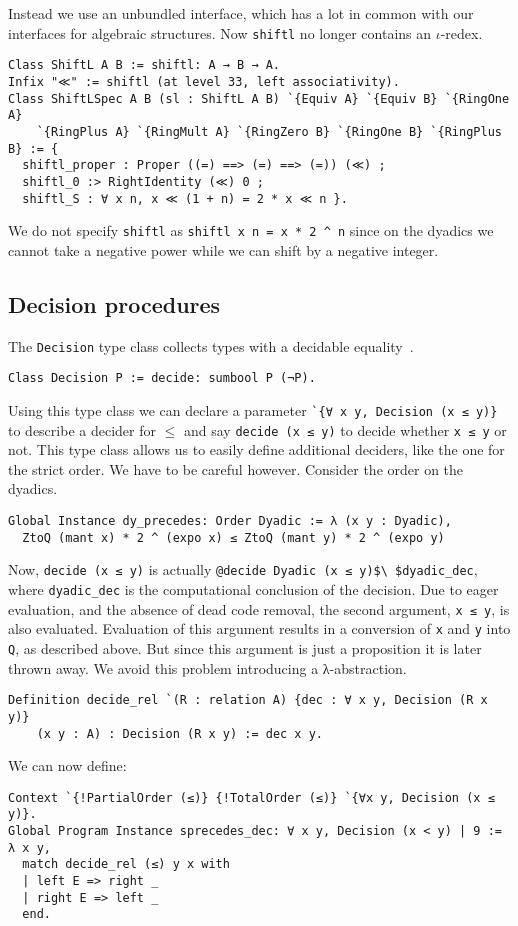 \documentclass[a4paper,10pt,runningheads]{llncs}
\begin{document}
Instead we use an unbundled interface, which has a lot in common with our interfaces for algebraic structures. Now \lstinline|shiftl| no longer contains an $ι$-redex. 
\begin{lstlisting}
Class ShiftL A B := shiftl: A → B → A.
Infix "≪" := shiftl (at level 33, left associativity).
Class ShiftLSpec A B (sl : ShiftL A B) `{Equiv A} `{Equiv B} `{RingOne A} 
	`{RingPlus A} `{RingMult A} `{RingZero B} `{RingOne B} `{RingPlus B} := {
  shiftl_proper : Proper ((=) ==> (=) ==> (=)) (≪) ;
  shiftl_0 :> RightIdentity (≪) 0 ;
  shiftl_S : ∀ x n, x ≪ (1 + n) = 2 * x ≪ n }.
\end{lstlisting}
We do not specify \lstinline|shiftl| as \lstinline|shiftl x n = x * 2 ^ n| since on the dyadics we cannot take a negative power while we can shift by a negative integer.

\subsection{Decision procedures}
\label{section:decision}
The \lstinline|Decision| type class collects types with a decidable equality~\cite{math-classes}.
\begin{lstlisting}
Class Decision P := decide: sumbool P (¬P).
\end{lstlisting}
Using this type class we can declare a parameter \lstinline|`{∀ x y, Decision (x ≤ y)}| to describe a decider for $≤$ and say \lstinline|decide (x ≤ y)| to decide whether \lstinline|x ≤ y| or not. This type class allows us to easily define additional deciders, like the one for the strict order. We have to be careful however. Consider the order on the dyadics.
\begin{lstlisting}
Global Instance dy_precedes: Order Dyadic := λ (x y : Dyadic), 
  ZtoQ (mant x) * 2 ^ (expo x) ≤ ZtoQ (mant y) * 2 ^ (expo y)
\end{lstlisting}
Now, \lstinline|decide (x ≤ y)| is actually \lstinline|@decide Dyadic (x ≤ y)$\ $dyadic_dec|, where \lstinline|dyadic_dec| is the computational conclusion of the decision. Due to eager evaluation, and the absence of dead code removal, the second argument, \lstinline|x ≤ y|, is also evaluated. Evaluation of this argument results in a conversion of \lstinline|x| and \lstinline|y| into \lstinline|Q|, as described above. But since this argument is just a proposition it is later thrown away. We avoid this problem introducing a λ-abstraction.
\begin{lstlisting}
Definition decide_rel `(R : relation A) {dec : ∀ x y, Decision (R x y)} 
	(x y : A) : Decision (R x y) := dec x y.
\end{lstlisting}
We can now define:
\begin{lstlisting}
Context `{!PartialOrder (≤)} {!TotalOrder (≤)} `{∀x y, Decision (x ≤ y)}.
Global Program Instance sprecedes_dec: ∀ x y, Decision (x < y) | 9 := λ x y,
  match decide_rel (≤) y x with
  | left E => right _
  | right E => left _
  end.
\end{lstlisting}
\end{document}
